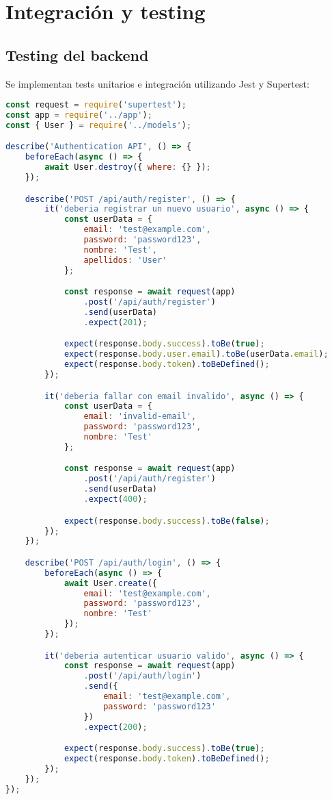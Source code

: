 \section{Integración y testing}

\subsection{Testing del backend}

Se implementan tests unitarios e integración utilizando Jest y Supertest:

\begin{lstlisting}[language=JavaScript, caption=Tests de la API de autenticación]
const request = require('supertest');
const app = require('../app');
const { User } = require('../models');

describe('Authentication API', () => {
    beforeEach(async () => {
        await User.destroy({ where: {} });
    });

    describe('POST /api/auth/register', () => {
        it('deberia registrar un nuevo usuario', async () => {
            const userData = {
                email: 'test@example.com',
                password: 'password123',
                nombre: 'Test',
                apellidos: 'User'
            };

            const response = await request(app)
                .post('/api/auth/register')
                .send(userData)
                .expect(201);

            expect(response.body.success).toBe(true);
            expect(response.body.user.email).toBe(userData.email);
            expect(response.body.token).toBeDefined();
        });

        it('deberia fallar con email invalido', async () => {
            const userData = {
                email: 'invalid-email',
                password: 'password123',
                nombre: 'Test'
            };

            const response = await request(app)
                .post('/api/auth/register')
                .send(userData)
                .expect(400);

            expect(response.body.success).toBe(false);
        });
    });

    describe('POST /api/auth/login', () => {
        beforeEach(async () => {
            await User.create({
                email: 'test@example.com',
                password: 'password123',
                nombre: 'Test'
            });
        });

        it('deberia autenticar usuario valido', async () => {
            const response = await request(app)
                .post('/api/auth/login')
                .send({
                    email: 'test@example.com',
                    password: 'password123'
                })
                .expect(200);

            expect(response.body.success).toBe(true);
            expect(response.body.token).toBeDefined();
        });
    });
});
\end{lstlisting}

